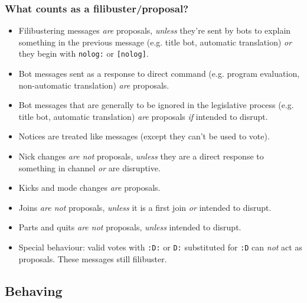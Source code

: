 \documentclass[11pt]{article}
\begin{document}
\subsubsection{What counts as a filibuster/proposal?}

\begin{itemize}

\item Filibustering messages \emph{are} proposals, \emph{unless} they're sent by bots to explain something in the previous message (e.g. title bot, automatic translation) \emph{or} they begin with \texttt{nolog:} or \texttt{[nolog]}.
\item Bot messages sent as a response to direct command (e.g. program evaluation, non-automatic translation) \emph{are} proposals.
\item Bot messages that are generally to be ignored in the legislative process (e.g. title bot, automatic translation) \emph{are} proposals \emph{if} intended to disrupt.
\item Notices are treated like messages (except they can't be used to vote).
\item Nick changes \emph{are not} proposals, \emph{unless} they are a direct response to something in channel \emph{or} are disruptive.
\item Kicks and mode changes \emph{are} proposals.
\item Joins \emph{are not} proposals, \emph{unless} it is a first join \emph{or} intended to disrupt.
\item Parts and quits \emph{are not} proposals, \emph{unless} intended to disrupt.
\item Special behaviour: valid votes with \texttt{:D:} or \texttt{D:} substituted for \texttt{:D} can \emph{not} act as proposals. These messages
still filibuster.
\end{itemize}

\subsection{Behaving}
\end{document}
